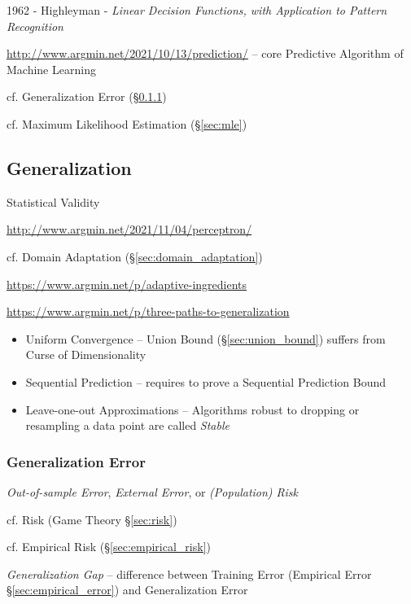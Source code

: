 1962 - Highleyman -
\emph{Linear Decision Functions, with Application to Pattern Recognition}

\url{http://www.argmin.net/2021/10/13/prediction/} -- core Predictive Algorithm
of Machine Learning

cf. Generalization Error (\S\ref{sec:generalization_error})

cf. Maximum Likelihood Estimation (\S\ref{sec:mle})



\subsection{Generalization}\label{sec:generalization}

Statistical Validity

\url{http://www.argmin.net/2021/11/04/perceptron/}

cf. Domain Adaptation (\S\ref{sec:domain_adaptation})

\url{https://www.argmin.net/p/adaptive-ingredients}

\url{https://www.argmin.net/p/three-paths-to-generalization}

\begin{itemize}
  \item Uniform Convergence -- Union Bound (\S\ref{sec:union_bound}) suffers
    from Curse of Dimensionality
  \item Sequential Prediction -- requires to prove a Sequential Prediction Bound
  \item Leave-one-out Approximations -- Algorithms robust to dropping or
    resampling a data point are called \emph{Stable}
\end{itemize}



\subsubsection{Generalization Error}\label{sec:generalization_error}

\emph{Out-of-sample Error}, \emph{External Error}, or \emph{(Population) Risk}

\fist cf. Risk (Game Theory \S\ref{sec:risk})

cf. Empirical Risk (\S\ref{sec:empirical_risk})

\emph{Generalization Gap} -- difference between Training Error (Empirical Error
\S\ref{sec:empirical_error}) and Generalization Error



